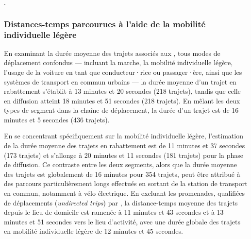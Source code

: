 \begin{refsegment}
\textcolor{blue}{\autocite[20]{hasiak_estimation_2023}}.%

\subsubsection*{Distances-temps parcourues à l'aide de la mobilité individuelle légère
    \label{chap5:distances-temps-parcourues}
    }
    
En examinant la durée moyenne des trajets associés aux , tous modes de déplacement confondus — incluant la marche, la mobilité individuelle légère, l'usage de la voiture en tant que conducteur·rice ou passager·ère, ainsi que les systèmes de transport en commun urbains — la durée moyenne d'un trajet en rabattement s'établit à 13 minutes et 20 secondes (218 trajets), tandis que celle en diffusion atteint 18 minutes et 51 secondes (218 trajets). En mêlant les deux types de segment dans la chaîne de déplacement, la durée d'un trajet est de 16 minutes et 5 secondes (436 trajets).%

En se concentrant spécifiquement sur la mobilité individuelle légère, l'estimation de la durée moyenne des trajets en rabattement est de 11 minutes et 37 secondes (173 trajets) et s'allonge à 20 minutes et 11 secondes (181 trajets) pour la phase de diffusion. Ce contraste entre les deux segments, alors que la durée moyenne des trajets est globalement de 16 minutes pour 354 trajets, peut être attribué à des parcours particulièrement longs effectués en sortant de la station de transport en commun, notamment à vélo électrique. En excluant les promenades, qualifiées de déplacements  (\textsl{undirected trips}) par \textcolor{blue}{\textcite[8-9]{hook_undirected_2021}}, la distance-temps moyenne des trajets depuis le lieu de domicile est ramenée à 11 minutes et 43 secondes et à 13 minutes et 51 secondes vers le lieu d'activité, avec une durée globale des trajets en mobilité individuelle légère de 12 minutes et 45 secondes.%


\end{refsegment}
